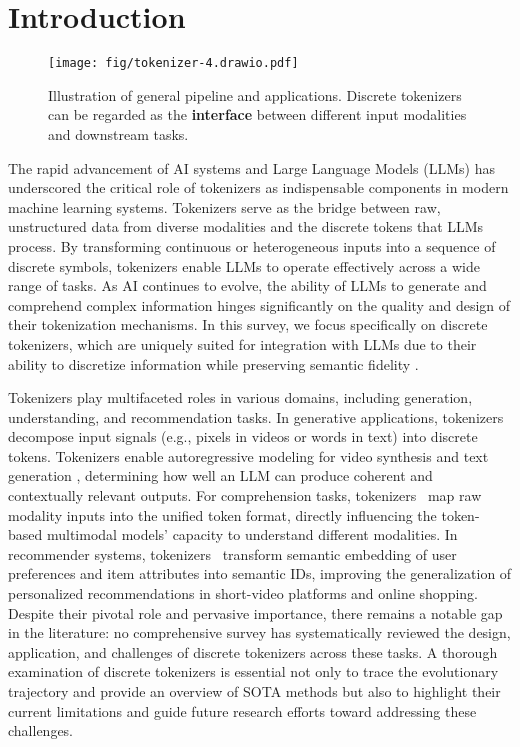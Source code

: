 

\section{Introduction}


\begin{figure*}
    \centering
    \texttt{[image: fig/tokenizer-4.drawio.pdf]}
    \caption{Illustration of general pipeline and applications. Discrete tokenizers can be regarded as the \textbf{interface} between different input modalities and downstream tasks.}
    \label{fig:enter-label}
    \vspace{-3mm}
\end{figure*}


The rapid advancement of AI systems and Large Language Models (LLMs) has underscored the critical role of tokenizers as indispensable components in modern machine learning systems. Tokenizers serve as the bridge between raw, unstructured data from diverse modalities 
and the discrete tokens that LLMs process. By transforming continuous or heterogeneous inputs into a sequence of discrete symbols, tokenizers enable LLMs to operate effectively across a wide range of tasks. As AI continues to evolve, the ability of LLMs to generate and comprehend complex information hinges significantly on the quality and design of their tokenization mechanisms. In this survey, we focus specifically on discrete tokenizers, which are uniquely suited for integration with LLMs due to their ability to discretize information while preserving semantic fidelity \cite{team2024chameleon,chen2024next}.


Tokenizers play multifaceted roles in various domains, including generation, understanding, and recommendation tasks. 
In generative applications, tokenizers decompose input signals (e.g., pixels in videos or words in text) into discrete tokens. Tokenizers enable autoregressive modeling for video synthesis \cite{tian2024visual} and text generation \cite{guo2025deepseek}, determining how well an LLM can produce coherent and contextually relevant outputs.
For comprehension tasks, tokenizers~\cite{team2024chameleon,chen2025janus} map raw modality inputs into the unified token format, directly influencing the token-based multimodal models' capacity to understand different modalities.
In recommender systems, tokenizers~\cite{rajput2023tiger,singh2024better} transform semantic embedding of user preferences and item attributes into semantic IDs, improving the generalization of personalized recommendations in short-video platforms and online shopping.
Despite their pivotal role and pervasive importance, there remains a notable gap in the literature: no comprehensive survey has systematically reviewed the design, application, and challenges of discrete tokenizers across these tasks.
A thorough examination of discrete tokenizers is essential not only to trace the evolutionary trajectory and provide an overview of SOTA methods but also to highlight their current limitations and guide future research efforts toward addressing these challenges.


